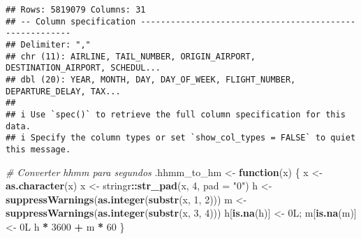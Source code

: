 \documentclass[
]{article}
\newenvironment{Shaded}{\begin{snugshade}}{\end{snugshade}}
\newcommand{\AttributeTok}[1]{\textcolor[rgb]{0.13,0.29,0.53}{#1}}
\newcommand{\CommentTok}[1]{\textcolor[rgb]{0.56,0.35,0.01}{\textit{#1}}}
\newcommand{\ControlFlowTok}[1]{\textcolor[rgb]{0.13,0.29,0.53}{\textbf{#1}}}
\newcommand{\DataTypeTok}[1]{\textcolor[rgb]{0.13,0.29,0.53}{#1}}
\newcommand{\DecValTok}[1]{\textcolor[rgb]{0.00,0.00,0.81}{#1}}
\newcommand{\FunctionTok}[1]{\textcolor[rgb]{0.13,0.29,0.53}{\textbf{#1}}}
\newcommand{\NormalTok}[1]{#1}
\newcommand{\OtherTok}[1]{\textcolor[rgb]{0.56,0.35,0.01}{#1}}
\newcommand{\SpecialCharTok}[1]{\textcolor[rgb]{0.81,0.36,0.00}{\textbf{#1}}}
\newcommand{\StringTok}[1]{\textcolor[rgb]{0.31,0.60,0.02}{#1}}
\begin{document}
\begin{verbatim}
## Rows: 5819079 Columns: 31
## -- Column specification --------------------------------------------------------
## Delimiter: ","
## chr (11): AIRLINE, TAIL_NUMBER, ORIGIN_AIRPORT, DESTINATION_AIRPORT, SCHEDUL...
## dbl (20): YEAR, MONTH, DAY, DAY_OF_WEEK, FLIGHT_NUMBER, DEPARTURE_DELAY, TAX...
## 
## i Use `spec()` to retrieve the full column specification for this data.
## i Specify the column types or set `show_col_types = FALSE` to quiet this message.
\end{verbatim}

\begin{Shaded}
\begin{Highlighting}[]
\CommentTok{\# Converter hhmm para segundos}
\NormalTok{.hhmm\_to\_hm }\OtherTok{\textless{}{-}} \ControlFlowTok{function}\NormalTok{(x) \{}
\NormalTok{  x }\OtherTok{\textless{}{-}} \FunctionTok{as.character}\NormalTok{(x)}
\NormalTok{  x }\OtherTok{\textless{}{-}}\NormalTok{ stringr}\SpecialCharTok{::}\FunctionTok{str\_pad}\NormalTok{(x, }\DecValTok{4}\NormalTok{, }\AttributeTok{pad =} \StringTok{"0"}\NormalTok{)}
\NormalTok{  h }\OtherTok{\textless{}{-}} \FunctionTok{suppressWarnings}\NormalTok{(}\FunctionTok{as.integer}\NormalTok{(}\FunctionTok{substr}\NormalTok{(x, }\DecValTok{1}\NormalTok{, }\DecValTok{2}\NormalTok{)))}
\NormalTok{  m }\OtherTok{\textless{}{-}} \FunctionTok{suppressWarnings}\NormalTok{(}\FunctionTok{as.integer}\NormalTok{(}\FunctionTok{substr}\NormalTok{(x, }\DecValTok{3}\NormalTok{, }\DecValTok{4}\NormalTok{)))}
\NormalTok{  h[}\FunctionTok{is.na}\NormalTok{(h)] }\OtherTok{\textless{}{-}} \DecValTok{0}\DataTypeTok{L}\NormalTok{; m[}\FunctionTok{is.na}\NormalTok{(m)] }\OtherTok{\textless{}{-}} \DecValTok{0}\DataTypeTok{L}
\NormalTok{  h }\SpecialCharTok{*} \DecValTok{3600} \SpecialCharTok{+}\NormalTok{ m }\SpecialCharTok{*} \DecValTok{60}
\NormalTok{\}}
\end{Highlighting}
\end{Shaded}
\end{document}
